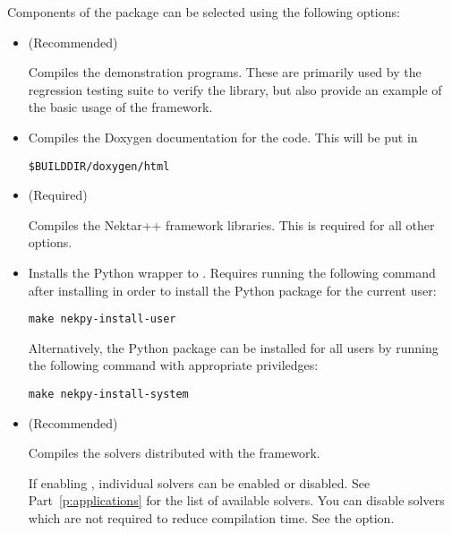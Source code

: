Components of the \nekpp package can be selected using the following options:
\begin{itemize}
    \item {} (Recommended)

    Compiles the demonstration programs. These are primarily used by the
    regression testing suite to verify the \nekpp library, but also provide an
    example of the basic usage of the framework.

    \item {}

    Compiles the Doxygen documentation for the code. This will be put in
    \begin{lstlisting}[style=BashInputStyle]
    $BUILDDIR/doxygen/html
    \end{lstlisting}

    \item {} (Required)

    Compiles the Nektar++ framework libraries. This is required for all other
    options.

    \item {}

    Installs the Python wrapper to \nekpp. Requires running the following command 
    after installing \nekpp in order to install the Python package for the 
    current user:
    \begin{lstlisting}[style=BashInputStyle]
    make nekpy-install-user
    \end{lstlisting}

    Alternatively, the Python package can be installed for all users by running
    the following command with appropriate priviledges:
    \begin{lstlisting}[style=BashInputStyle]
    make nekpy-install-system
    \end{lstlisting}

    \item {} (Recommended)

    Compiles the solvers distributed with the \nekpp framework.

    If enabling , individual solvers can be
    enabled or disabled. See Part~\ref{p:applications} for the list of available
    solvers. You can disable solvers which are not required to reduce
    compilation time. See the  option.


\end{itemize}
